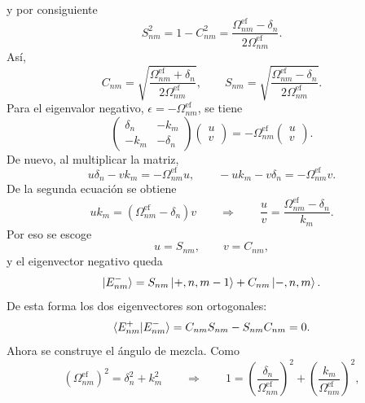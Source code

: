 \documentclass[11pt]{article}
\begin{document}
y por consiguiente
\begin{equation}
  S_{nm}^2
  =
  1-C_{nm}^2
  =
  \frac{\Omega_{nm}^{\mathrm{ef}}-\delta_n}
  {2\Omega_{nm}^{\mathrm{ef}}}.
\end{equation}
As\'i,
\begin{equation}
  C_{nm}
  =
  \sqrt{
  \frac{\Omega_{nm}^{\mathrm{ef}}+\delta_n}
  {2\Omega_{nm}^{\mathrm{ef}}}
  },
  \qquad
  S_{nm}
  =
  \sqrt{
  \frac{\Omega_{nm}^{\mathrm{ef}}-\delta_n}
  {2\Omega_{nm}^{\mathrm{ef}}}
  }.
\end{equation}
Para el eigenvalor negativo, $\epsilon=-\Omega_{nm}^{\mathrm{ef}}$, se tiene
\begin{equation}
  \begin{pmatrix}
  \delta_n & -k_m\\
  -k_m & -\delta_n
  \end{pmatrix}
  \begin{pmatrix}
  u\\
  v
  \end{pmatrix}
  =
  -\Omega_{nm}^{\mathrm{ef}}
  \begin{pmatrix}
  u\\
  v
  \end{pmatrix}.
\end{equation}
De nuevo, al multiplicar la matriz,
\begin{equation}
  u\delta_n-vk_m=-\Omega_{nm}^{\mathrm{ef}}u,
  \qquad
  -uk_m-v\delta_n=-\Omega_{nm}^{\mathrm{ef}}v.
\end{equation}
De la segunda ecuaci\'on se obtiene
\begin{equation}
  uk_m=(\Omega_{nm}^{\mathrm{ef}}-\delta_n)v
  \qquad\Rightarrow\qquad
  \frac{u}{v}
  =
  \frac{\Omega_{nm}^{\mathrm{ef}}-\delta_n}{k_m}.
\end{equation}
Por eso se escoge
\begin{equation}
  u=S_{nm},
  \qquad
  v=C_{nm},
\end{equation}
y el eigenvector negativo queda
\begin{equation}
  \ket{E_{nm}^{-}}
  =
  S_{nm}\ket{+,n,m-1}
  +
  C_{nm}\ket{-,n,m}.
\end{equation}
De esta forma los dos eigenvectores son ortogonales:
\begin{equation}
  \braket{E_{nm}^{+}|E_{nm}^{-}}
  =
  C_{nm}S_{nm}-S_{nm}C_{nm}
  =
  0.
\end{equation}
Ahora se construye el \'angulo de mezcla. Como
\begin{equation}
  (\Omega_{nm}^{\mathrm{ef}})^2=\delta_n^2+k_m^2
  \qquad\Rightarrow\qquad
  1
  =
  \left(
  \frac{\delta_n}{\Omega_{nm}^{\mathrm{ef}}}
  \right)^2
  +
  \left(
  \frac{k_m}{\Omega_{nm}^{\mathrm{ef}}}
  \right)^2,
\end{equation}
\end{document}
